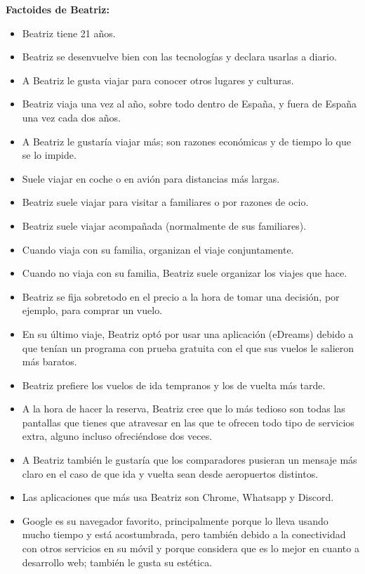 \textbf{Factoides de Beatriz:}
\begin{itemize}
    \item Beatriz tiene 21 años.
    \item Beatriz se desenvuelve bien con las tecnologías y declara usarlas a diario.
    \item A Beatriz le gusta viajar para conocer otros lugares y culturas.
    \item Beatriz viaja una vez al año, sobre todo dentro de España, y fuera de España una vez cada dos años.
    \item A Beatriz le gustaría viajar más; son razones económicas y de tiempo lo que se lo impide.
    \item Suele viajar en coche o en avión para distancias más largas.
    \item Beatriz suele viajar para visitar a familiares o por razones de ocio.
    \item Beatriz suele viajar acompañada (normalmente de sus familiares).
    \item Cuando viaja con su familia, organizan el viaje conjuntamente.
    \item Cuando no viaja con su familia, Beatriz suele organizar los viajes que hace.
    \item Beatriz se fija sobretodo en el precio a la hora de tomar una decisión, por ejemplo, para comprar un vuelo.
    \item En su último viaje, Beatriz optó por usar una aplicación (eDreams) debido a que tenían un programa con prueba gratuita con el que sus vuelos le salieron más baratos.
    \item Beatriz prefiere los vuelos de ida tempranos y los de vuelta más tarde.
    \item A la hora de hacer la reserva, Beatriz cree que lo más tedioso son todas las pantallas que tienes que atravesar en las que te ofrecen todo tipo de servicios extra, alguno incluso ofreciéndose dos veces.
    \item A Beatriz también le gustaría que los comparadores pusieran un mensaje más claro en el caso de que ida y vuelta sean desde aeropuertos distintos.
    \item Las aplicaciones que más usa Beatriz son Chrome, Whatsapp y Discord.
    \item Google es su navegador favorito, principalmente porque lo lleva usando mucho tiempo y está acostumbrada, pero también debido a la conectividad con otros servicios en su móvil y porque considera que es lo mejor en cuanto a desarrollo web; también le gusta su estética.

\end{itemize}
